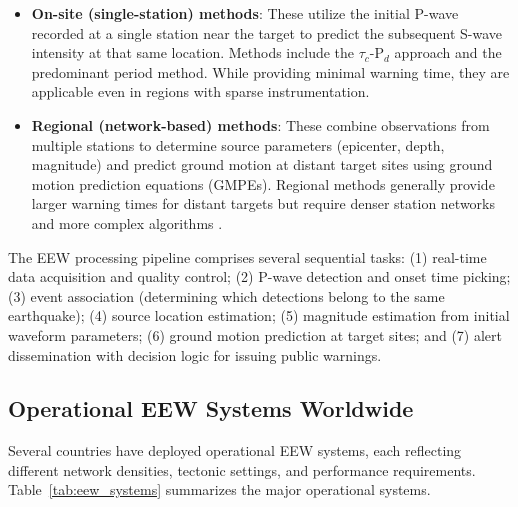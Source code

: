 \documentclass[review,authoryear]{elsarticle}
\begin{document}
\begin{itemize}
  \item \textbf{On-site (single-station) methods}: These utilize the initial P-wave recorded at a single station near the target to predict the subsequent S-wave intensity at that same location. Methods include the $\tau_c$-P$_d$ approach \citep{wu2005experiment} and the predominant period method. While providing minimal warning time, they are applicable even in regions with sparse instrumentation.
  
  \item \textbf{Regional (network-based) methods}: These combine observations from multiple stations to determine source parameters (epicenter, depth, magnitude) and predict ground motion at distant target sites using ground motion prediction equations (GMPEs). Regional methods generally provide larger warning times for distant targets but require denser station networks and more complex algorithms \citep{allen2012earthquake, gasparini2007earthquake}.
\end{itemize}

The EEW processing pipeline comprises several sequential tasks: (1) real-time data acquisition and quality control; (2) P-wave detection and onset time picking; (3) event association (determining which detections belong to the same earthquake); (4) source location estimation; (5) magnitude estimation from initial waveform parameters; (6) ground motion prediction at target sites; and (7) alert dissemination with decision logic for issuing public warnings.

\subsection{Operational EEW Systems Worldwide}

Several countries have deployed operational EEW systems, each reflecting different network densities, tectonic settings, and performance requirements. Table~\ref{tab:eew_systems} summarizes the major operational systems.
\end{document}
